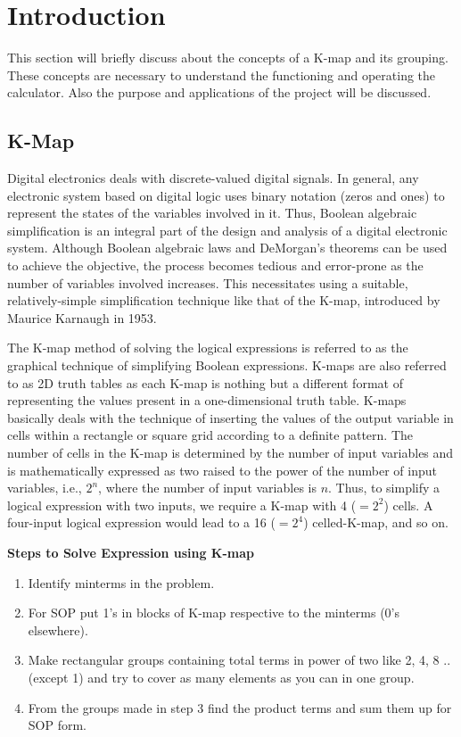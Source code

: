 \documentclass[12pt,a4paper]{article}
\begin{document}
\newpage
\setcounter{page}{1}
\section{Introduction}
This section will briefly discuss about the concepts of a K-map and its grouping. These concepts are necessary to understand the functioning and operating the calculator. Also the purpose and applications of the project will be discussed.

\subsection{K-Map}
Digital electronics deals with discrete-valued digital signals. In general, any electronic system based on digital logic uses binary notation (zeros and ones) to represent the states of the variables involved in it. Thus, Boolean algebraic simplification is an integral part of the design and analysis of a digital electronic system. Although Boolean algebraic laws and DeMorgan's theorems can be used to achieve the objective, the process becomes tedious and error-prone as the number of variables involved increases. This necessitates using a suitable, relatively-simple simplification technique like that of the K-map, introduced by Maurice Karnaugh in 1953.

The K-map method of solving the logical expressions is referred to as the graphical technique of simplifying Boolean expressions. K-maps are also referred to as 2D truth tables as each K-map is nothing but a different format of representing the values present in a one-dimensional truth table. K-maps basically deals with the technique of inserting the values of the output variable in cells within a rectangle or square grid according to a definite pattern. The number of cells in the K-map is determined by the number of input variables and is mathematically expressed as two raised to the power of the number of input variables, i.e., $2^n$, where the number of input variables is $n$. Thus, to simplify a logical expression with two inputs, we require a K-map with 4 ($=2^2$) cells. A four-input logical expression would lead to a 16 ($=2^4$) celled-K-map, and so on.
\vspace{1em}

\textbf{Steps to Solve Expression using K-map}
\begin{enumerate}
    \item Identify minterms in the problem.
    \item For SOP put 1’s in blocks of K-map respective to the minterms (0’s elsewhere).
    \item Make rectangular groups containing total terms in power of two like 2, 4, 8 ..(except 1) and try to cover as many elements as you can in one group.
    \item From the groups made in step 3 find the product terms and sum them up for SOP form.
\end{enumerate}
\end{document}
